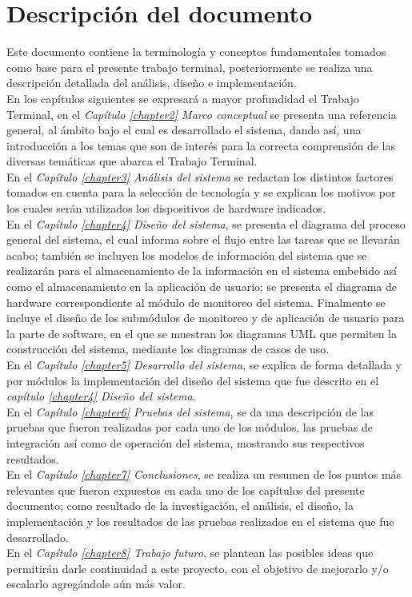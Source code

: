 \section{Descripción del documento}
Este documento contiene la terminología y conceptos fundamentales tomados como base para el presente trabajo terminal, posteriormente se realiza una descripción detallada del análisis,  diseño e implementación. 
\\
En los capítulos siguientes se expresará a mayor profundidad el Trabajo Terminal, en el \textit{Capítulo \ref{chapter2} Marco conceptual} se presenta una referencia general, al ámbito bajo el cual es desarrollado el sistema, dando así, una introducción a los temas que son de interés para la correcta comprensión de las diversas temáticas que abarca el Trabajo Terminal.
\\
En el \textit{Capítulo \ref{chapter3} Análisis del sistema} se redactan los distintos factores tomados en cuenta para la selección de tecnología y se explican los motivos por los cuales serán utilizados los dispositivos de hardware indicados.
\\
En el \textit{Capítulo \ref{chapter4} Diseño del sistema}, se presenta el diagrama del proceso general del sistema, el cual informa sobre el flujo entre las tareas que se llevarán acabo; también se incluyen los modelos de información del sistema que se realizarán para el almacenamiento de la información en el sistema embebido así como el almacenamiento en la aplicación de usuario; se presenta el diagrama de hardware correspondiente al módulo de monitoreo del sistema. Finalmente se incluye el diseño de los submódulos de monitoreo y de aplicación de usuario para la parte de software, en el que se muestran los diagramas UML que permiten la construcción del sistema, mediante los diagramas de casos de uso.
\\
En el \textit{Capítulo \ref{chapter5} Desarrollo del sistema}, se explica de forma detallada y por módulos la implementación del diseño del sistema que fue descrito en el \textit{capítulo \ref{chapter4} Diseño del sistema}.
\\
En el \textit{Capítulo \ref{chapter6} Pruebas del sistema}, se da una descripción de las pruebas que fueron realizadas por cada uno de los módulos, las pruebas de integración así como de operación del sistema, mostrando sus respectivos resultados.
\\
En el \textit{Capítulo \ref{chapter7} Conclusiones}, 
se realiza un resumen de los puntos más relevantes que fueron expuestos en cada uno de los capítulos del presente documento; como resultado de la investigación, el análisis, el diseño, la implementación y los resultados de las pruebas realizados en el sistema que fue desarrollado.   
\\
En el \textit{Capítulo \ref{chapter8} Trabajo futuro}, se plantean las posibles ideas que permitirán darle continuidad a este proyecto, con el objetivo de mejorarlo y/o escalarlo agregándole aún más valor.

